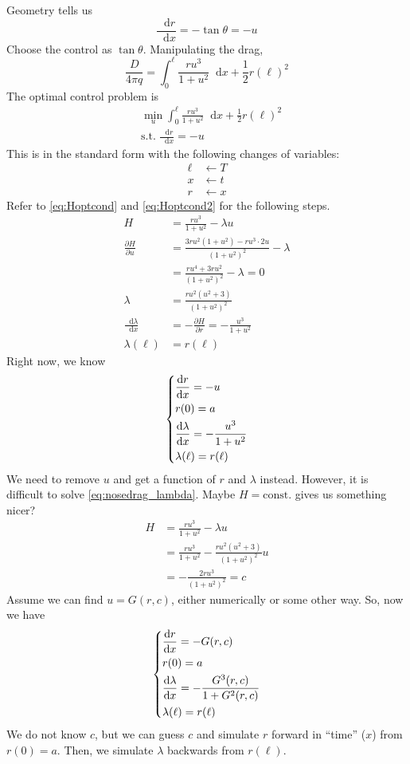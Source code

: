 \documentclass[letterpaper,12pt,titlepage]{report}
\newcommand*\dif{\mathop{}\!\mathrm{d}}
\newcommand*\pder[2]{\frac{\partial #1}{\partial #2}}
\theoremstyle{plain}
\theoremstyle{definition}
\begin{document}
Geometry tells us
\[ \frac{\dif r}{\dif x} = -\tan\theta = -u \]
Choose the control as $\tan\theta$. Manipulating the drag,
\[ \frac{D}{4\pi q} = \int_0^\ell \frac{ru^3}{1+u^2} \dif x + \frac{1}{2} r(\ell)^2 \]
The optimal control problem is
\begin{align}
  & \min_u \int_0^\ell \frac{ru^3}{1+u^2} \dif x + \frac{1}{2} r(\ell)^2 \\
  & \text{s.t. } \frac{\dif r}{\dif x}=-u
\end{align}
This is in the standard form with the following changes of variables:
\begin{align}
  \ell & \longleftarrow T \\
  x & \longleftarrow t \\
  r & \longleftarrow x
\end{align}
Refer to \eqref{eq:Hoptcond} and \eqref{eq:Hoptcond2} for the following steps.
\begin{align}
  H &= \frac{ru^3}{1+u^2} - \lambda u \\
  \pder{H}{u} &= \frac{3ru^2(1+u^2)-ru^3\cdot 2u}{(1+u^2)^2} - \lambda \\
    &= \frac{ru^4 + 3ru^2}{(1+u^2)^2} - \lambda = 0 \\
  \lambda &= \frac{ru^2 (u^2 + 3)}{(1+u^2)^2} \label{eq:nosedrag_lambda} \\
  \frac{\dif\lambda}{\dif x} &= -\pder{H}{r} = -\frac{u^3}{1+u^2} \\
  \lambda(\ell) &= r(\ell)
\end{align}
Right now, we know
\[ \begin{dcases}
    \frac{\dif r}{\dif x} = -u \\
    r(0) = a \\
    \frac{\dif\lambda}{\dif x} = -\frac{u^3}{1+u^2} \\
    \lambda(\ell) = r(\ell)
  \end{dcases} \]
We need to remove $u$ and get a function of $r$ and $\lambda$ instead. However, it is difficult to solve \eqref{eq:nosedrag_lambda}. Maybe $H=\text{const.}$ gives us something nicer?
\begin{align}
  H &= \frac{ru^3}{1+u^2} - \lambda u \\
    &= \frac{ru^3}{1+u^2} - \frac{ru^2 (u^2 + 3)}{(1+u^2)^2} u \\
    &= - \frac{2ru^3}{(1+u^2)^2} = c
\end{align}
Assume we can find $u=G(r,c)$, either numerically or some other way. So, now we have
\[ \begin{dcases}
    \frac{\dif r}{\dif x} = -G(r,c) \\
    r(0) = a \\
    \frac{\dif\lambda}{\dif x} = -\frac{G^3(r,c)}{1+G^2(r,c)} \\
    \lambda(\ell) = r(\ell)
  \end{dcases} \]
We do not know $c$, but we can guess $c$ and simulate $r$ forward in ``time'' ($x$) from $r(0)=a$. Then, we simulate $\lambda$ backwards from $r(\ell)$.
\end{document}
